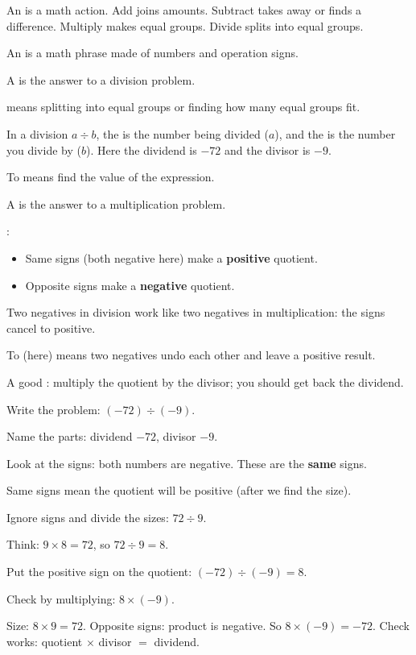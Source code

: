\begin{words}
  \item An is a math action. Add joins amounts. Subtract takes away or finds a difference. Multiply makes equal groups. Divide splits into equal groups.
  \item An is a math phrase made of numbers and operation signs.
  \item A is the answer to a division problem.
  \item {}means splitting into equal groups or finding how many equal groups fit.
  \item In a division $a \div b$, the is the number being divided ($a$), and the is the number you divide by ($b$). Here the dividend is $-72$ and the divisor is $-9$.
  \item To means find the value of the expression.
  \item A is the answer to a multiplication problem.
  \item {}:
    \begin{itemize}[leftmargin=1.8em,label=--,topsep=0.25\baselineskip,itemsep=0.25\baselineskip]
      \item Same signs (both negative here) make a \textbf{positive} quotient.
      \item Opposite signs make a \textbf{negative} quotient.
    \end{itemize}
  \item Two negatives in division work like two negatives in multiplication: the signs cancel to positive.
  \item To (here) means two negatives undo each other and leave a positive result.
  \item A good : multiply the quotient by the divisor; you should get back the dividend.
\end{words}

\begin{steps}
  \item Write the problem: $(-72) \div (-9)$.
  \item Name the parts: dividend $-72$, divisor $-9$.
  \item Look at the signs: both numbers are negative. These are the \textbf{same} signs.
  \item Same signs mean the quotient will be positive (after we find the size).
  \item Ignore signs and divide the sizes: $72 \div 9$.
  \item Think: $9 \times 8 = 72$, so $72 \div 9 = 8$.
  \item Put the positive sign on the quotient: $(-72) \div (-9) = 8$.
  \item Check by multiplying: $8 \times (-9)$.
  \item Size: $8 \times 9 = 72$. Opposite signs: product is negative. So $8 \times (-9) = -72$. Check works: quotient $\times$ divisor $=$ dividend.
\end{steps}

